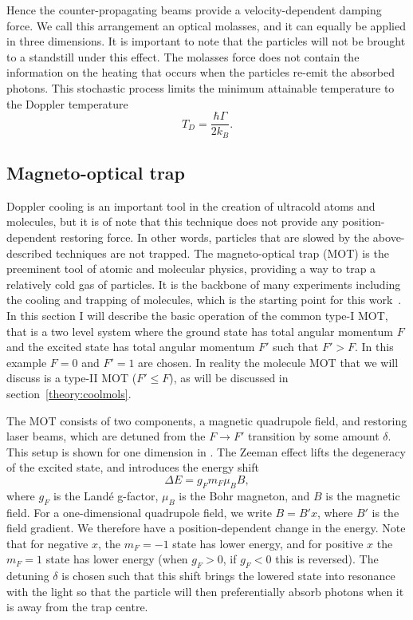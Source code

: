 Hence the counter-propagating beams provide a velocity-dependent damping
force. We call this arrangement an optical molasses, and it can equally be
applied in three dimensions.
%
It is important to note that the particles will not be brought to a standstill
under this effect. The molasses force does not contain the information
on the heating that occurs when the particles re-emit the absorbed photons.
This stochastic process limits the minimum attainable temperature to the
Doppler temperature~\cite{Metcalf1999}
%
\begin{equation}
  T_D = \frac{\hbar\Gamma}{2k_B}.
\end{equation}

\subsection{Magneto-optical trap}

Doppler cooling is an important tool in the creation of ultracold atoms and
molecules, but it is of note that this technique does not provide any
position-dependent restoring force. In other words, particles that are slowed
by the above-described techniques are not trapped.
%
The magneto-optical trap (MOT) is the preeminent tool of atomic and molecular
physics, providing a way to trap a relatively cold gas of particles. It is the
backbone of many experiments including the cooling and trapping of \CaF{}
molecules, which is the starting point for this work~\cite{Williams2017}. In
this section I will describe the basic operation of the common type-I MOT, that
is a two level system where the ground state has total angular momentum $F$ and
the excited state has total angular momentum $F'$ such that $F'>F$. In this
example $F=0$ and $F'=1$ are chosen.  In reality the molecule MOT that we will
discuss is a type-II MOT ($F'\leq F$), as will be discussed in
section~\ref{theory:coolmols}.

The MOT consists of two components, a magnetic quadrupole field, and restoring
laser beams, which are detuned from the $F\rightarrow F'$ transition by some
amount $\delta$. This setup is shown for one dimension in
. The Zeeman effect lifts the degeneracy of the excited state, and
introduces the energy shift~\cite{Binney}
%
\begin{equation}
  \Delta E = g_F m_F \mu_B B,
  \label{theory:eqn:zeeman}
\end{equation}
%
where $g_F$ is the Land\'e g-factor, $\mu_B$ is the Bohr magneton, and $B$ is
the magnetic field. For a one-dimensional quadrupole field, we write $B=B'x$,
where $B'$ is the field gradient. We therefore have a position-dependent change
in the energy. Note that for negative $x$, the $m_F=-1$ state has lower energy,
and for positive $x$ the $m_F=1$ state has lower energy (when $g_F>0$, if
$g_F<0$ this is reversed).
%
The detuning $\delta$ is chosen such that this shift brings the lowered state
into resonance with the light so that the particle will then preferentially
absorb photons when it is away from the trap centre.

